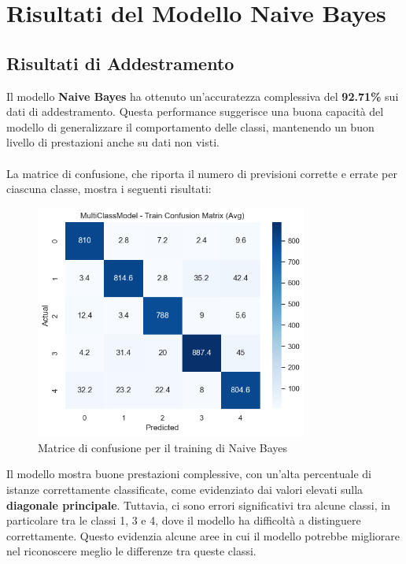 \newpage

\section{Risultati del Modello Naive Bayes}

\subsection{Risultati di Addestramento}

Il modello \textbf{Naive Bayes} ha ottenuto un'accuratezza complessiva del \textbf{92.71\%} sui dati di addestramento. Questa performance suggerisce una buona capacità del modello di generalizzare il comportamento delle classi, mantenendo un buon livello di prestazioni anche su dati non visti. \\ \\
La matrice di confusione, che riporta il numero di previsioni corrette e errate per ciascuna classe, mostra i seguenti risultati:

\begin{figure}[H]
    \centering
    \includegraphics[width=0.8\textwidth]{images/confusion_matrix_train_naive_bayes.png}
    \caption{Matrice di confusione per il training di Naive Bayes}
    \label{fig:confusion_matrix_train_naive_bayes}
\end{figure}

Il modello mostra buone prestazioni complessive, con un'alta percentuale di istanze correttamente classificate, come evidenziato dai valori elevati sulla \textbf{diagonale principale}. Tuttavia, ci sono errori significativi tra alcune classi, in particolare tra le classi 1, 3 e 4, dove il modello ha difficoltà a distinguere correttamente. Questo evidenzia alcune aree in cui il modello potrebbe migliorare nel riconoscere meglio le differenze tra queste classi.

